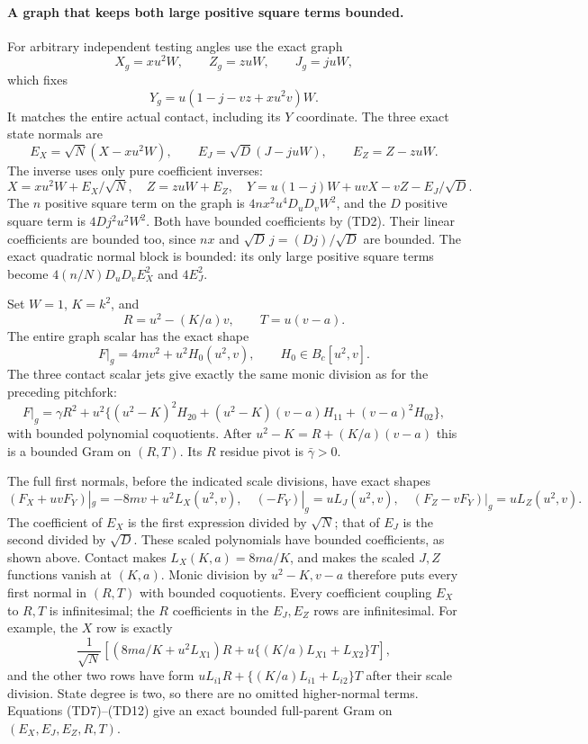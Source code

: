 \paragraph{A graph that keeps both large positive square terms bounded.}
For arbitrary independent testing angles use the exact graph
\[
 X_g=xu^2W,\qquad Z_g=zuW,\qquad J_g=juW,
\]
which fixes
\[
 Y_g=u(1-j-vz+xu^2v)W.                            \tag{TD6}
\]
It matches the entire actual contact, including its $Y$ coordinate.
The three exact state normals are
\[
 E_X=\sqrt N(X-xu^2W),\qquad
 E_J=\sqrt D(J-juW),\qquad E_Z=Z-zuW.             \tag{TD7}
\]
The inverse uses only pure coefficient inverses:
\[
 X=xu^2W+E_X/\sqrt N,\quad Z=zuW+E_Z,\quad
 Y=u(1-j)W+uvX-vZ-E_J/\sqrt D.                   \tag{TD8}
\]
The $n$ positive square term on the graph is
$4nx^2u^4D_uD_vW^2$, and the $D$ positive square term is
$4Dj^2u^2W^2$. Both have bounded coefficients by (TD2).
Their linear coefficients are bounded too, since $nx$ and
$\sqrt D\,j=(Dj)/\sqrt D$ are bounded. The exact quadratic
normal block is bounded: its only large positive square terms become
$4(n/N)D_uD_vE_X^2$ and $4E_J^2$.

Set $W=1$, $K=k^2$, and
\[
 R=u^2-(K/a)v,\qquad T=u(v-a).
\]
The entire graph scalar has the exact shape
\[
 F|_g=4mv^2+u^2H_0(u^2,v),\qquad H_0\in B_c[u^2,v].             \tag{TD9}
\]
The three contact scalar jets give exactly the same monic division
as for the preceding pitchfork:
\[
 F|_g=\gamma R^2+u^2\{(u^2-K)^2H_{20}
                   +(u^2-K)(v-a)H_{11}+(v-a)^2H_{02}\},         \tag{TD10}
\]
with bounded polynomial coquotients. After
$u^2-K=R+(K/a)(v-a)$ this is a bounded Gram on $(R,T)$.
Its $R$ residue pivot is $\bar\gamma>0$.

The full first normals, before the indicated scale divisions, have
exact shapes
\[
 (F_X+uvF_Y)|_g=-8mv+u^2L_X(u^2,v),\quad
 (-F_Y)|_g=uL_J(u^2,v),\quad
 (F_Z-vF_Y)|_g=uL_Z(u^2,v).                       \tag{TD11}
\]
The coefficient of $E_X$ is the first expression divided by
$\sqrt N$; that of $E_J$ is the second divided by $\sqrt D$.
These scaled polynomials have bounded coefficients, as shown above.
Contact makes $L_X(K,a)=8ma/K$, and makes the scaled $J,Z$ functions
vanish at $(K,a)$. Monic division by $u^2-K,v-a$ therefore puts
every first normal in $(R,T)$ with bounded coquotients.
Every coefficient coupling $E_X$ to $R,T$ is infinitesimal; the
$R$ coefficients in the $E_J,E_Z$ rows are infinitesimal.
For example, the $X$ row is exactly
\[
\frac1{\sqrt N}\left[
 (8ma/K+u^2L_{X1})R
 +u\{(K/a)L_{X1}+L_{X2}\}T\right],              \tag{TD12}
\]
and the other two rows have form
$uL_{i1}R+\{(K/a)L_{i1}+L_{i2}\}T$ after their scale division.
State degree is two, so there are no omitted higher-normal terms.
Equations (TD7)--(TD12) give an exact bounded full-parent Gram on
$(E_X,E_J,E_Z,R,T)$.

